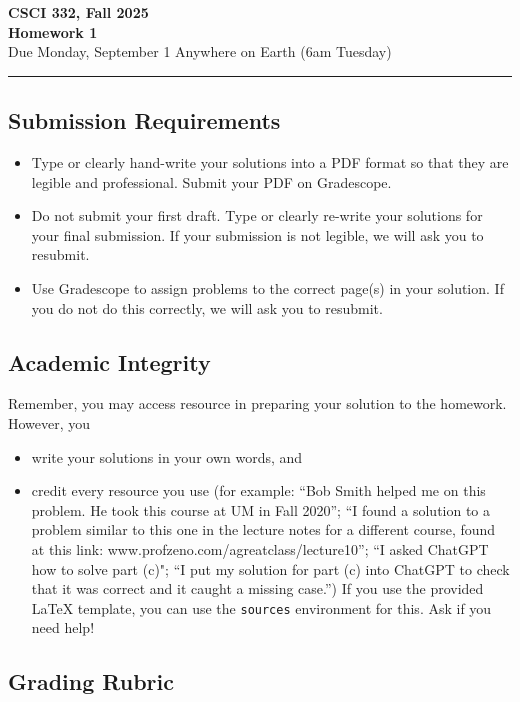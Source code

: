 \documentclass[11pt]{article}
\begin{document}
\begin{center}
\Large\textbf{CSCI 332, Fall 2025}%
\\
\LARGE\textbf{Homework 1}%
\\[0.5ex]
\large Due Monday, September 1 Anywhere on Earth (6am Tuesday)
\end{center}

\bigskip
\hrule
\bigskip

\subsection*{Submission Requirements}
\begin{itemize}
    \item Type or clearly hand-write your solutions into a PDF format so that they are legible and professional. Submit your PDF on Gradescope. 
    \item Do not submit your first draft. Type or clearly re-write your solutions for your final submission. If your submission is not legible, we will ask you to resubmit.
    \item Use Gradescope to assign problems to the correct page(s) in your solution. If you do not do this correctly, we will ask you to resubmit.
\end{itemize}

\subsection*{Academic Integrity}

Remember, you may access  resource in preparing your solution to the homework. However, you 
\begin{itemize}
    \item write your solutions in your own words, and
    \item credit every resource you use (for example: ``Bob Smith helped me on this problem. He took this course at UM in Fall 2020''; ``I found a solution to a problem similar to this one in the lecture notes for a different course, found at this link: www.profzeno.com/agreatclass/lecture10''; ``I asked ChatGPT how to solve  part (c)"; ``I put my solution for part (c) into ChatGPT to check that it was correct and it caught a missing case.'') If you use the provided LaTeX template, you can use the \texttt{sources} environment for this. Ask if you need help!
\end{itemize}

\subsection*{Grading Rubric}
\end{document}
